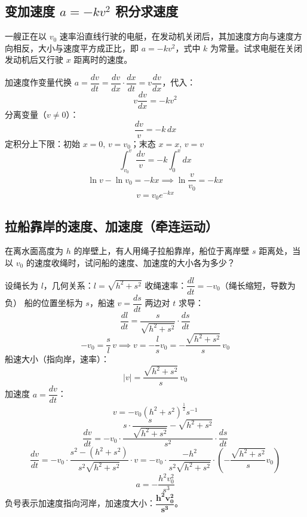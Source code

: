 \subsection{\texorpdfstring{变加速度 $a=-kv^2$ 积分求速度}{变加速度a=-kv^2积分求速度}}
一艘正在以 $v_0$ 速率沿直线行驶的电艇，在发动机关闭后，其加速度方向与速度方向相反，大小与速度平方成正比，即 $a=-kv^2$，式中 $k$ 为常量。试求电艇在关闭发动机后又行驶 $x$ 距离时的速度。
\begin{solution}
加速度作变量代换 $a=\dfrac{dv}{dt}=\dfrac{dv}{dx}\cdot\dfrac{dx}{dt}=v\dfrac{dv}{dx}$，代入：
\[
v\frac{dv}{dx} = -kv^2
\]
分离变量（$v\neq0$）：
\[
\frac{dv}{v} = -k\,dx
\]
定积分上下限：初始 $x=0,\,v=v_0$；末态 $x=x,\,v=v$
\[
\int_{v_0}^{v} \frac{dv}{v} = -k\int_{0}^{x}dx
\]
\[
\ln v - \ln v_0 = -kx \implies \ln\frac{v}{v_0}=-kx
\]
\[
\boxed{v = v_0 e^{-kx}}
\]
\end{solution}
\subsection{拉船靠岸的速度、加速度（牵连运动）}
\begin{center}
\end{center}
在离水面高度为 $h$ 的岸壁上，有人用绳子拉船靠岸，船位于离岸壁 $s$ 距离处，当以 $v_0$ 的速度收绳时，试问船的速度、加速度的大小各为多少？
\begin{solution}
设绳长为 $l$，几何关系：$l=\sqrt{h^2+s^2}$
收绳速率：$\dfrac{dl}{dt}=-v_0$（绳长缩短，导数为负）
船的位置坐标为 $s$，船速 $v=\dfrac{ds}{dt}$
两边对 $t$ 求导：
\[
\frac{dl}{dt} = \frac{s}{\sqrt{h^2+s^2}} \cdot \frac{ds}{dt}
\]
\[
-v_0 = \frac{s}{l}\,v \implies v = -\frac{l}{s}v_0 = -\frac{\sqrt{h^2+s^2}}{s}\,v_0
\]
船速大小（指向岸，速率）：
\[
\boxed{|v| = \frac{\sqrt{h^2+s^2}}{s}\,v_0}
\]
加速度 $a=\dfrac{dv}{dt}$：
\[
v = -v_0 (h^2+s^2)^{\frac12} s^{-1}
\]
\[
\frac{dv}{dt} = -v_0 \cdot \frac{s\cdot \dfrac{s}{\sqrt{h^2+s^2}} - \sqrt{h^2+s^2}}{s^2} \cdot \frac{ds}{dt}
\]
\[
\frac{dv}{dt} = -v_0 \cdot \frac{s^2-(h^2+s^2)}{s^2\sqrt{h^2+s^2}} \cdot v
= -v_0 \cdot \frac{-h^2}{s^2\sqrt{h^2+s^2}} \cdot \left(-\frac{\sqrt{h^2+s^2}}{s}v_0\right)
\]
\[
\boxed{a = -\frac{h^2 v_0^2}{s^3}}
\]
负号表示加速度指向河岸，加速度大小：$\boldsymbol{\dfrac{h^2 v_0^2}{s^3}}$。
\end{solution}

